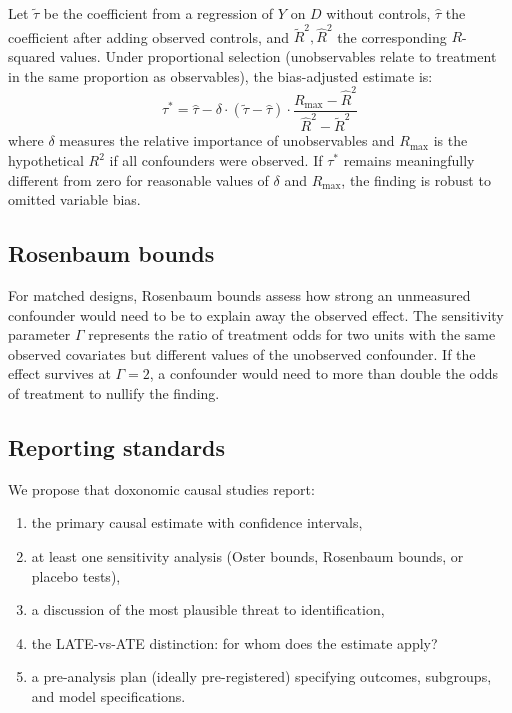 \begin{proposition}
\label{prop:oster}
Let $\tilde{\tau}$ be the coefficient from a regression of $Y$ on $D$ without controls, $\hat{\tau}$ the coefficient after adding observed controls, and $\tilde{R}^2, \hat{R}^2$ the corresponding $R$-squared values.
Under proportional selection (unobservables relate to treatment in the same proportion as observables), the bias-adjusted estimate is:
\[
  \tau^* = \hat{\tau} - \delta \cdot (\tilde{\tau} - \hat{\tau}) \cdot \frac{R_{\max} - \hat{R}^2}{\hat{R}^2 - \tilde{R}^2}
\]
where $\delta$ measures the relative importance of unobservables and $R_{\max}$ is the hypothetical $R^2$ if all confounders were observed.
If $\tau^*$ remains meaningfully different from zero for reasonable values of $\delta$ and $R_{\max}$, the finding is robust to omitted variable bias.
\end{proposition}

\subsection{Rosenbaum bounds}

For matched designs, Rosenbaum bounds assess how strong an unmeasured confounder would need to be to explain away the observed effect.
The sensitivity parameter $\Gamma$ represents the ratio of treatment odds for two units with the same observed covariates but different values of the unobserved confounder.
If the effect survives at $\Gamma = 2$, a confounder would need to more than double the odds of treatment to nullify the finding.

\subsection{Reporting standards}

We propose that doxonomic causal studies report:
\begin{enumerate}[nosep]
  \item the primary causal estimate with confidence intervals,
  \item at least one sensitivity analysis (Oster bounds, Rosenbaum bounds, or placebo tests),
  \item a discussion of the most plausible threat to identification,
  \item the LATE-vs-ATE distinction: for whom does the estimate apply?
  \item a pre-analysis plan (ideally pre-registered) specifying outcomes, subgroups, and model specifications.
\end{enumerate}

